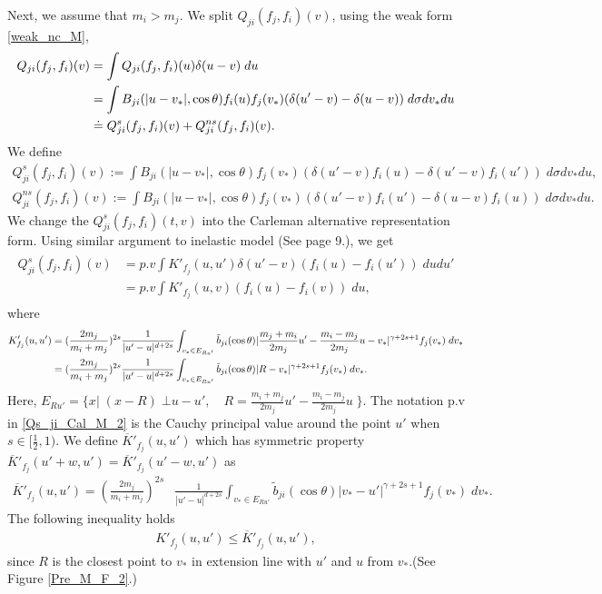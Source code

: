 \documentclass[reqno,10pt]{amsart}
\numberwithin{equation}{section}
\begin{document}
\noindent Next, we assume that $m_i>m_j$. 
We split $Q_{ji}(f_j,f_i)(v)$, using the weak form \eqref{weak_nc_M},
\begin{align}
   Q_{ji}(f_j,f_i)(v)
   &=\int Q_{ji}(f_j,f_i)(u)\delta(u-v) \;du \notag \\
     &= \int B_{ji}(|u-v_*|, \cos\theta)f_i(u)f_j(v_*) (\delta(u'-v)-\delta(u-v)) \;d\sigma dv_* du \notag\\
    &\doteq Q^{s}_{ji}(f_j,f_i)(v) + Q^{ns}_{ji}(f_j,f_i)(v).\label{Qs_Qns_M_2}
\end{align}
We define
\begin{align} 
    Q^{s}_{ji}(f_j,f_i)(v) := \int B_{ji}(|u-v_*|, \cos\theta)f_j(v_*)(\delta(u'-v)f_i(u)-\delta(u'-v)f_i(u'))\; d\sigma dv_*du, \label{Qs_M_2} \\
    Q^{ns}_{ji}(f_j,f_i)(v) := \int B_{ji}(|u-v_*|, \cos\theta)f_j(v_*)(\delta(u'-v)f_i(u')-\delta(u-v)f_i(u))\; d\sigma dv_* du.\label{Qns_M_2}
\end{align}
We change the $Q_{ji}^{s}(f_j,f_i)(t,v)$ into the Carleman alternative representation form. Using similar argument to inelastic model (See page 9.), we get
\begin{align} \label{Qs_ji_Cal_M_2}
\begin{split}
     Q_{ji}^{s}(f_j,f_i)(v) &= p.v \int K'_{f_j}(u,u')\delta(u'-v)(f_i(u)-f_i(u')) \;dudu'  \\ 
     &= p.v \int K'_{f_j}(u,v)(f_i(u)-f_i(v))\;du,
\end{split}
\end{align}
where
\begin{align} 
    K'_{f_j}(u,u')&=(\frac{2m_j}{m_i+m_j})^{2s}\frac{1}{|u'-u|^{d+2s}} \int_{v_* \in E_{Ru'}}\tilde{b}_{ji}(\cos\theta)|\frac{m_j+m_i}{2m_j}u'-\frac{m_i-m_j}{2m_j}u-v_*|^{\gamma+2s+1} f_j(v_*) \;dv_* \notag \\
    &=(\frac{2m_j}{m_i+m_j})^{2s}\frac{1}{|u'-u|^{d+2s}} \int_{v_* \in E_{Ru'}}\tilde{b}_{ji}(\cos\theta)|R-v_*|^{\gamma+2s+1} f_j(v_*) \;dv_*. \label{Kf_M_2}
\end{align} Here, $E_{Ru'}=\{x|\; (x-R)\;\bot u-u', \quad R=\frac{m_i+m_j}{2m_j}u'-\frac{m_i-m_j}{2m_j}u\;\}.$
The notation p.v in \eqref{Qs_ji_Cal_M_2} is the Cauchy principal value around the point $u'$ when $s\in[\frac{1}{2},1).$ We define $\overline{K}'_{f_j}(u,u')$ which has symmetric property $\overline{K}'_{f_j}(u'+w,u')= \overline{K}'_{f_j}(u'-w,u')$ as
\begin{align} \label{K'f_j_M_2}
    \overline{K}'_{f_j}(u,u')=(\frac{2m_j}{m_i+m_j})^{2s}&\frac{1}{|u'-u|^{d+2s}} \int_{v_* \in E_{Ru'}}\tilde{b}_{ji}(\cos\theta)|v_*-u'|^{\gamma+2s+1} f_j(v_*) \;dv_*.
\end{align} 
The following inequality holds 
\begin{align} \label{K_M_2_inequ}
    {K}'_{f_j}(u,u')\leq \overline{K}'_{f_j}(u,u'),
\end{align} since $R$ is the closest point to $v_*$ in extension line with $u'$ and $u$ from $v_*$.(See Figure \ref{Pre_M_F_2}.) \vspace{3mm}
\end{document}
